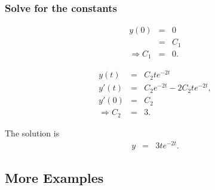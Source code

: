 \begin{frame}
  \frametitle{Solve for the constants}

  \begin{eqnarray*}
    y(0) & = & 0 \\
    & = & C_1 \\
    \Rightarrow C_1 & = & 0.
  \end{eqnarray*}

  \begin{eqnarray*}
    y(t) & = & C_2 t e^{-2t} \\
    y'(t) & = & C_2 e^{-2t} - 2 C_2 t e^{-2t}, \\
    y'(0) & = & C_2 \\
    \Rightarrow C_2 & = & 3.
  \end{eqnarray*}

  The solution is
  \begin{eqnarray*}
    y & = & 3 t e^{-2t}.
  \end{eqnarray*}

\end{frame}

\subsection{More Examples}


